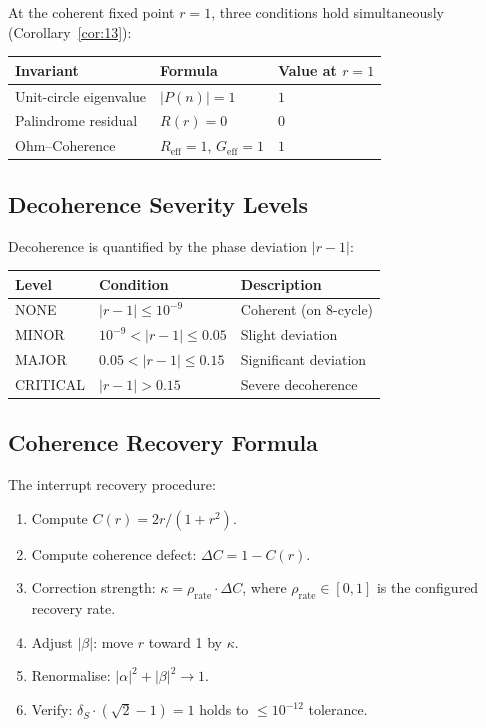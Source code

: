 \documentclass[12pt,a4paper]{article}
\theoremstyle{plain}
\theoremstyle{definition}
\theoremstyle{remark}
\newcommand{\abs}[1]{\lvert #1 \rvert}
\newcommand{\dS}{\delta_S}        %
\newcommand{\Geff}{G_{\mathrm{eff}}}
\newcommand{\Reff}{R_{\mathrm{eff}}}
\begin{document}
At the coherent fixed point $r=1$, three conditions hold simultaneously
(Corollary~\ref{cor:13}):

\begin{center}
\begin{tabular}{@{}lll@{}}
\toprule
Invariant & Formula & Value at $r=1$\\
\midrule
Unit-circle eigenvalue & $\abs{P(n)} = 1$ & $1$\\
Palindrome residual & $R(r) = 0$ & $0$\\
Ohm--Coherence & $\Reff = 1$, $\Geff = 1$ & $1$\\
\bottomrule
\end{tabular}
\end{center}

\subsection{Decoherence Severity Levels}

Decoherence is quantified by the phase deviation $\abs{r-1}$:

\begin{center}
\begin{tabular}{@{}lll@{}}
\toprule
Level & Condition & Description\\
\midrule
NONE & $\abs{r-1} \le 10^{-9}$ & Coherent (on 8-cycle) \\
MINOR & $10^{-9} < \abs{r-1} \le 0.05$ & Slight deviation \\
MAJOR & $0.05 < \abs{r-1} \le 0.15$ & Significant deviation \\
CRITICAL & $\abs{r-1} > 0.15$ & Severe decoherence \\
\bottomrule
\end{tabular}
\end{center}

\subsection{Coherence Recovery Formula}

The interrupt recovery procedure:
\begin{enumerate}
  \item Compute $C(r) = 2r/(1+r^2)$.
  \item Compute coherence defect: $\Delta C = 1 - C(r)$.
  \item Correction strength: $\kappa = \rho_{\mathrm{rate}}\cdot\Delta C$,
    where $\rho_{\mathrm{rate}}\in[0,1]$ is the configured recovery rate.
  \item Adjust $\abs{\beta}$: move $r$ toward 1 by $\kappa$.
  \item Renormalise: $\abs{\alpha}^2 + \abs{\beta}^2 \to 1$.
  \item Verify: $\dS\cdot(\sqrt{2}-1) = 1$ holds to $\le 10^{-12}$ tolerance.
\end{enumerate}
\end{document}
